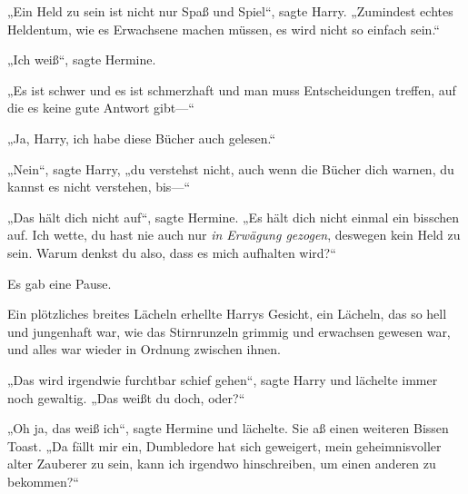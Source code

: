 „Ein Held zu sein ist nicht nur Spaß und Spiel“, sagte Harry. „Zumindest echtes Heldentum, wie es Erwachsene machen müssen, es wird nicht so einfach sein.“

„Ich weiß“, sagte Hermine.

„Es ist schwer und es ist schmerzhaft und man muss Entscheidungen treffen, auf die es keine gute Antwort gibt—“

„Ja, Harry, ich habe diese Bücher auch gelesen.“

„Nein“, sagte Harry, „du verstehst nicht, auch wenn die Bücher dich warnen, du kannst es nicht verstehen, bis—“

„Das hält dich nicht auf“, sagte Hermine. „Es hält dich nicht einmal ein bisschen auf. Ich wette, du hast nie auch nur \emph{in Erwägung gezogen}, deswegen kein Held zu sein. Warum denkst du also, dass es mich aufhalten wird?“

Es gab eine Pause.

Ein plötzliches breites Lächeln erhellte Harrys Gesicht, ein Lächeln, das so hell und jungenhaft war, wie das Stirnrunzeln grimmig und erwachsen gewesen war, und alles war wieder in Ordnung zwischen ihnen.

„Das wird irgendwie furchtbar schief gehen“, sagte Harry und lächelte immer noch gewaltig. „Das weißt du doch, oder?“

„Oh ja, das weiß ich“, sagte Hermine und lächelte. Sie aß einen weiteren Bissen Toast. „Da fällt mir ein, Dumbledore hat sich geweigert, mein geheimnisvoller alter Zauberer zu sein, kann ich irgendwo hinschreiben, um einen anderen zu bekommen?“

